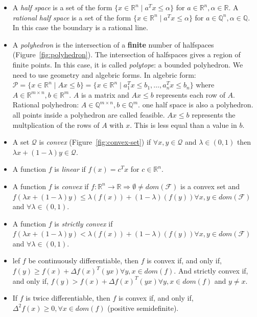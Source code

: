 \documentclass[main]{subfiles}
\begin{document}
\begin{itemize}

\item A \emph{half space} is a set of the form $\{ x \in \mathbb{R}^{n} \mid
a^{T} x \leq \alpha \}$ for $a \in \mathbb{R}^{n}, \alpha \in \mathbb{R}$.
\subitem A \emph{rational half space} is a set of the form $\{ x \in
\mathbb{R}^{n} \mid a^{T} x \leq \alpha \}$ for $a \in \mathbb{Q}^{n}, \alpha
\in \mathbb{Q}$. In this case the boundary is a rational line.

\item A \emph{polyhedron} is the intersection of a \textbf{finite} number of
halfspaces (Figure~\ref{fig:polyhedron}). The intersection of halfspaces gives a
region of finite points. In this case, it is called \emph{polytope}: a bounded
polyhedron. We need to use geometry and algebric forms. In algebric form:
$\mathcal{P} = \{ x \in \mathbb{R}^{n} \mid Ax \leq b \} = \{ x \in
\mathbb{R}^{n} \mid a_{1}^{T}x \leq b_{1}, \dots, a_{n}^{T}x \leq b_{n} \}$
where $A \in \mathbb{R}^{m \times n}, b \in \mathbb{R}^{m}$. $A$ is a matrix
and $Ax \leq b$ represents each row of $A$.
\subitem Rational polyhedron: $A \in \mathbb{Q}^{ m \times n}, b \in
\mathbb{Q}^{m}$.
\subitem one half space is also a polyhedron.
\subitem all points inside a polyhedron are called feasible.
\subitem $Ax \leq b$ represents the multplication of the rows of $A$ with $x$. This is less equal than a value in $b$.

\item A set $\mathcal{Q}$ is \emph{convex} (Figure~\ref{fig:convex-set}) if
$\forall x, y \in \mathcal{Q}$ and $\lambda \in (0,1)$ then $\lambda x +
(1 - \lambda)y \in \mathcal{Q}$.

\item A function $f$ is \emph{linear} if $f(x) = c^{T}x$ for $c \in
\mathbb{R}^{n}$.

\item A function $f$ is \emph{convex} if $f: \mathbb{R}^{n} \rightarrow
\mathbb{R} \Rightarrow \emptyset \neq dom(\mathcal{F})$ is a convex set and
$f(\lambda x + (1-\lambda)y) \leq \lambda (f(x)) + (1-\lambda)(f(y)) \forall
x, y \in dom(\mathcal{F})$ and $\forall \lambda \in (0,1)$.

\item A function $f$ is \emph{strictly convex} if $f(\lambda x + (1-\lambda)y)
< \lambda (f(x)) + (1-\lambda)(f(y)) \forall x, y \in dom(\mathcal{F})$ and
$\forall \lambda \in (0,1)$.

\item lef $f$ be continuously differentiable, then $f$ is convex if, and only
if, $f(y) \geq f(x) + \Delta f(x)^{T}(yx) \forall y,x \in dom(f)$. And strictly
convex if, and only if, $f(y) > f(x) + \Delta f(x)^{T}(yx) \forall y,x \in
dom(f)$ and $y \neq x$.

\item If $f$ is twice differentiable, then $f$ is convex if, and only if,
$\Delta^{2} f(x) \geq 0, \forall x \in dom(f)$ (positive semidefinite).
\end{itemize}
\end{document}
